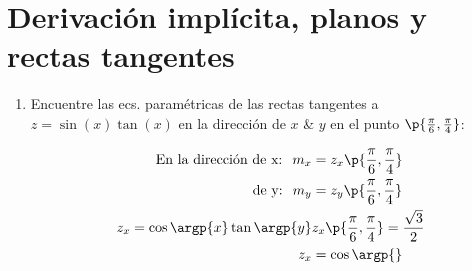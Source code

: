 \documentclass{article}
\begin{document}
\section{Derivación implícita, planos y rectas tangentes}
\begin{enumerate}I
    \item Encuentre las ecs. paramétricas de las rectas tangentes a $z=\sin (x) \tan (x)  $ en la dirección de $x$ \& $y$ en el punto $\p{\frac{\pi}{6} , \frac{\pi}{4} }$:
        \begin{center}
           \begin{align*}
               \text{ En la dirección de x:  } \; m_x &= z_x\p{\frac{\pi}{6},\frac{\pi}{4}  } \\ 
               \text{ de y:  }\; m_y &= z_y\p{\frac{\pi}{6} ,\frac{\pi}{4} } \\ 
               z_x = \cos \argp{x}  \tan \argp{y} & z_x\p{\frac{\pi}{6} , \frac{\pi}{4} } = \frac{\sqrt{3}}{2} \\
               z_x &= \cos  \argp{}  \\ 
           \end{align*}
        \end{center}
\end{enumerate}
\end{document}
